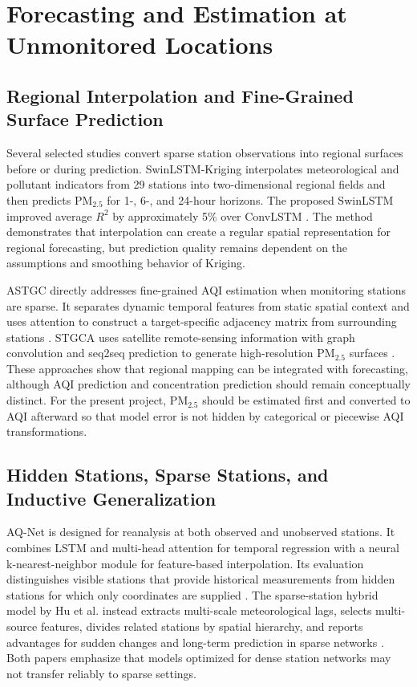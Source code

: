 \section{Forecasting and Estimation at Unmonitored Locations}

\subsection{Regional Interpolation and Fine-Grained Surface Prediction}

Several selected studies convert sparse station observations into regional surfaces before or during prediction. SwinLSTM-Kriging interpolates meteorological and pollutant indicators from 29 stations into two-dimensional regional fields and then predicts PM$_{2.5}$ for 1-, 6-, and 24-hour horizons. The proposed SwinLSTM improved average $R^2$ by approximately 5\% over ConvLSTM \cite{ref27}. The method demonstrates that interpolation can create a regular spatial representation for regional forecasting, but prediction quality remains dependent on the assumptions and smoothing behavior of Kriging.

ASTGC directly addresses fine-grained AQI estimation when monitoring stations are sparse. It separates dynamic temporal features from static spatial context and uses attention to construct a target-specific adjacency matrix from surrounding stations \cite{ref26}. STGCA uses satellite remote-sensing information with graph convolution and seq2seq prediction to generate high-resolution PM$_{2.5}$ surfaces \cite{ref21}. These approaches show that regional mapping can be integrated with forecasting, although AQI prediction and concentration prediction should remain conceptually distinct. For the present project, PM$_{2.5}$ should be estimated first and converted to AQI afterward so that model error is not hidden by categorical or piecewise AQI transformations.

\subsection{Hidden Stations, Sparse Stations, and Inductive Generalization}

AQ-Net is designed for reanalysis at both observed and unobserved stations. It combines LSTM and multi-head attention for temporal regression with a neural k-nearest-neighbor module for feature-based interpolation. Its evaluation distinguishes visible stations that provide historical measurements from hidden stations for which only coordinates are supplied \cite{ref28}. The sparse-station hybrid model by Hu et al. instead extracts multi-scale meteorological lags, selects multi-source features, divides related stations by spatial hierarchy, and reports advantages for sudden changes and long-term prediction in sparse networks \cite{ref29}. Both papers emphasize that models optimized for dense station networks may not transfer reliably to sparse settings.

